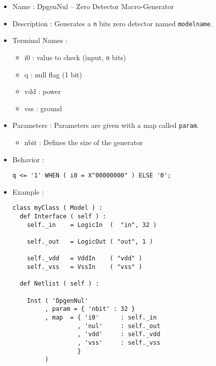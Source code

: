 \begin{itemize}
    \item Name : DpgenNul -- Zero Detector Macro-Generator
    \item Description : Generates a \verb-n- bits zero detector named \verb-modelname-.
    \item Terminal Names :
    \begin{itemize}
        \item i0 : value to check (input, \verb-n- bits)
        \item q : null flag (1 bit)
        \item vdd : power
        \item vss : ground
    \end{itemize}
    \item Parameters : Parameters are given with a map called \verb-param-.
    \begin{itemize}
        \item nbit : Defines the size of the generator
    \end{itemize}
    \item Behavior :
\begin{verbatim}
q <= '1' WHEN ( i0 = X"00000000" ) ELSE '0';
\end{verbatim}
    \item Example :
\begin{verbatim}
class myClass ( Model ) :
  def Interface ( self ) :
    self._in    = LogicIn  (  "in", 32 )
    
    self._out   = LogicOut ( "out", 1 )
    
    self._vdd   = VddIn    ( "vdd" )
    self._vss   = VssIn    ( "vss" )
    
  def Netlist ( self ) :
      
    Inst ( 'DpgenNul'
         , param = { 'nbit' : 32 }
         , map  = { 'i0'      : self._in
                  , 'nul'     : self._out
                  , 'vdd'     : self._vdd
                  , 'vss'     : self._vss
                  }
         )    
\end{verbatim}
\end{itemize}
